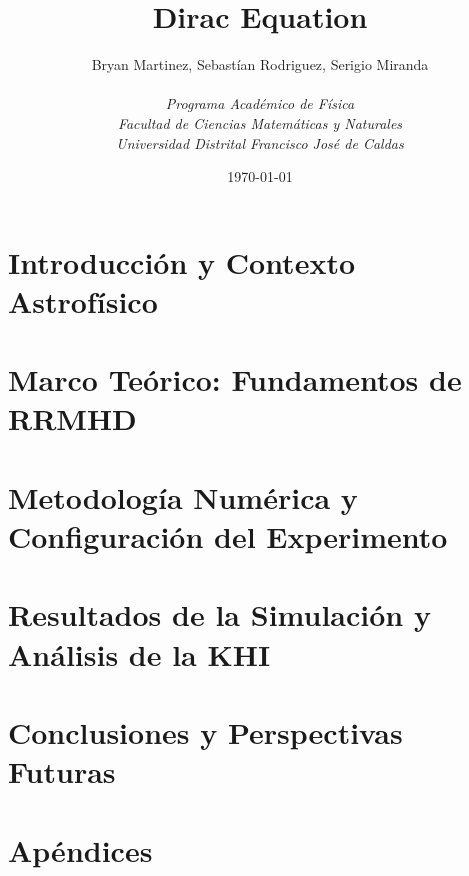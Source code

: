 \documentclass[11pt, english]{book}
\title{Dirac Equation}
\author{Bryan Martinez, Sebastían Rodriguez, Serigio Miranda \\ \ \\
  \textit{Programa Académico de Física} \\
  \textit{Facultad de Ciencias Matemáticas y Naturales} \\
  \textit{Universidad Distrital Francisco José de Caldas}
}
\date{\today}
\begin{document}
\frontmatter
\maketitle
\tableofcontents

\mainmatter







\chapter{Introducción y Contexto Astrofísico}
\label{ch:intro}


\chapter{Marco Teórico: Fundamentos de RRMHD}
\label{ch:rrmhd_theory}


\chapter{Metodología Numérica y Configuración del Experimento}
\label{ch:numerical_methods}


\chapter{Resultados de la Simulación y Análisis de la KHI}
\label{ch:results_discussion}


\chapter{Conclusiones y Perspectivas Futuras}
\label{ch:conclusions}


\appendix
\chapter{Apéndices}













\backmatter

\printbibliography %
\end{document}
